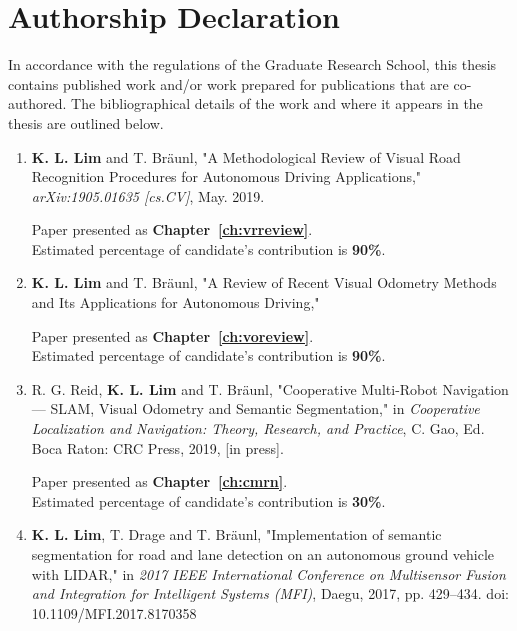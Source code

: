 \cleardoublepage
\setsinglecolumn
\chapter*{\centering \Large Authorship Declaration}
\thispagestyle{empty}


In accordance with the regulations of the Graduate Research School, this thesis contains published work and/or work prepared for publications that are co-authored. The bibliographical details of the work and where it appears in the thesis are outlined below.

\begin{enumerate}
	\item \textbf{K. L. Lim} and T. Bräunl, "A Methodological Review of Visual Road Recognition Procedures for Autonomous Driving Applications," \textit{arXiv:1905.01635 [cs.CV]}, May. 2019.
	
	Paper presented as \textbf{Chapter~\ref{ch:vrreview}}. \\
	Estimated percentage of candidate's contribution is \textbf{90\%}.
	
	\item \textbf{K. L. Lim} and T. Bräunl, "A Review of Recent Visual Odometry Methods and Its Applications for Autonomous Driving," %
	
	Paper presented as \textbf{Chapter~\ref{ch:voreview}}. \\
	Estimated percentage of candidate's contribution is \textbf{90\%}.
	
	\item R. G. Reid, \textbf{K. L. Lim} and T. Bräunl, "Cooperative Multi-Robot Navigation --- SLAM, Visual Odometry and Semantic Segmentation," in \textit{Cooperative Localization and Navigation: Theory, Research, and Practice}, C. Gao, Ed. Boca Raton: CRC Press, 2019, [in press].
	
	Paper presented as \textbf{Chapter~\ref{ch:cmrn}}. \\
	Estimated percentage of candidate's contribution is \textbf{30\%}.
	
	\item \textbf{K. L. Lim}, T. Drage and T. Bräunl, "Implementation of semantic segmentation for road and lane detection on an autonomous ground vehicle with LIDAR," in \textit{2017 IEEE International Conference on Multisensor Fusion and Integration for Intelligent Systems (MFI)}, Daegu, 2017, pp. 429--434. doi: 10.1109/MFI.2017.8170358
	

\end{enumerate}

